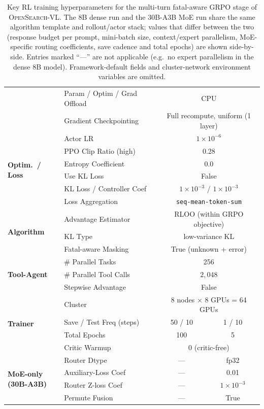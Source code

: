 \begin{table}[!tbp]
\begin{tabular}{@{}l l c c@{}}
& Param / Optim / Grad Offload & \multicolumn{2}{c}{CPU} \\
& Gradient Checkpointing & \multicolumn{2}{c}{Full recompute, uniform (1 layer)} \\
\midrule
\multirow{6}{*}{\textbf{Optim.\ / Loss}}
& Actor LR & \multicolumn{2}{c}{$1\times 10^{-6}$} \\
& PPO Clip Ratio (high) & \multicolumn{2}{c}{0.28} \\
& Entropy Coefficient & \multicolumn{2}{c}{0.0} \\
& Use KL Loss & \multicolumn{2}{c}{False} \\
& KL Loss / Controller Coef & \multicolumn{2}{c}{$1{\times}10^{-3}$ / $1{\times}10^{-3}$} \\
& Loss Aggregation & \multicolumn{2}{c}{\texttt{seq-mean-token-sum}} \\
\midrule
\multirow{3}{*}{\textbf{Algorithm}}
& Advantage Estimator & \multicolumn{2}{c}{RLOO (within GRPO objective)} \\
& KL Type & \multicolumn{2}{c}{low-variance KL} \\
& Fatal-aware Masking & \multicolumn{2}{c}{True (unknown + error)} \\
\midrule
\multirow{3}{*}{\textbf{Tool-Agent}}
& \# Parallel Tasks & \multicolumn{2}{c}{256} \\
& \# Parallel Tool Calls & \multicolumn{2}{c}{$2{,}048$} \\
& Stepwise Advantage & \multicolumn{2}{c}{False} \\
\midrule
\multirow{4}{*}{\textbf{Trainer}}
& Cluster & \multicolumn{2}{c}{8 nodes $\times$ 8 GPUs = 64 GPUs} \\
& Save / Test Freq (steps) & 50 / 10 & 1 / 10 \\
& Total Epochs & 100 & 5 \\
& Critic Warmup & \multicolumn{2}{c}{0 (critic-free)} \\
\midrule
\multirow{4}{*}{\parbox{1.6cm}{\raggedright\textbf{MoE-only\\(30B-A3B)}}}
& Router Dtype & --- & fp32 \\
& Auxiliary-Loss Coef & --- & 0.01 \\
& Router Z-loss Coef & --- & $1{\times}10^{-3}$ \\
& Permute Fusion & --- & True \\
\bottomrule
\end{tabular}
\caption{Key RL training hyperparameters for the multi-turn fatal-aware GRPO stage of \textsc{OpenSearch-VL}. The 8B dense run and the 30B-A3B MoE run share the same algorithm template and rollout/actor stack; values that differ between the two (response budget per prompt, mini-batch size, context/expert parallelism, MoE-specific routing coefficients, save cadence and total epochs) are shown side-by-side. Entries marked ``---'' are not applicable (e.g.\ no expert parallelism in the dense 8B model). Framework-default fields and cluster-network environment variables are omitted.}
\label{tab:rl-config}
\end{table}
